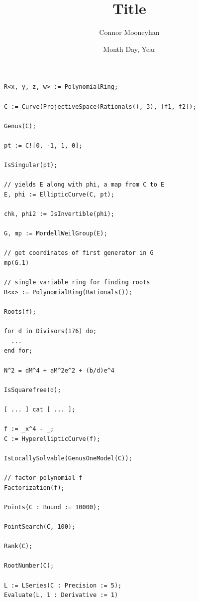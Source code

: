 \documentclass[12pt]{article}
\title{Title}
\author{Connor Mooneyhan}
\date{Month Day, Year}
\theoremstyle{definition}
\begin{document}
\begin{verbatim}
R<x, y, z, w> := PolynomialRing;

C := Curve(ProjectiveSpace(Rationals(), 3), [f1, f2]); 

Genus(C);

pt := C![0, -1, 1, 0];

IsSingular(pt);

// yields E along with phi, a map from C to E
E, phi := EllipticCurve(C, pt);

chk, phi2 := IsInvertible(phi);

G, mp := MordellWeilGroup(E);

// get coordinates of first generator in G
mp(G.1)

// single variable ring for finding roots
R<x> := PolynomialRing(Rationals());

Roots(f);

for d in Divisors(176) do;
  ...
end for;

N^2 = dM^4 + aM^2e^2 + (b/d)e^4

IsSquarefree(d);

[ ... ] cat [ ... ];

f := _x^4 - _;
C := HyperellipticCurve(f);

IsLocallySolvable(GenusOneModel(C));

// factor polynomial f
Factorization(f);

Points(C : Bound := 10000);

PointSearch(C, 100);

Rank(C);

RootNumber(C);

L := LSeries(C : Precision := 5);
Evaluate(L, 1 : Derivative := 1)
\end{verbatim}
\end{document}
